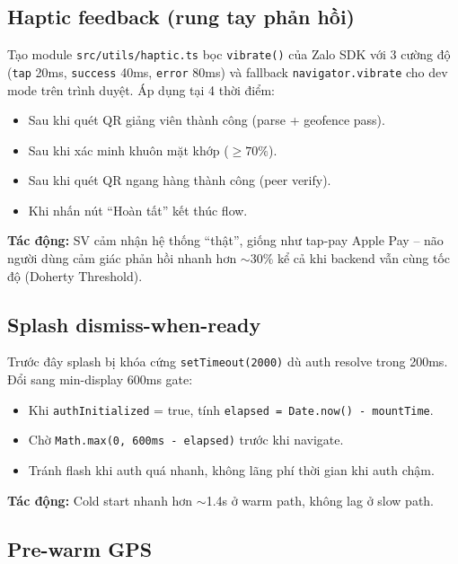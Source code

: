 \documentclass{article}
\begin{document}
\subsection{Haptic feedback (rung tay phản hồi)}

Tạo module \texttt{src/utils/haptic.ts} bọc \texttt{vibrate()} của Zalo SDK với 3 cường độ (\texttt{tap} 20ms, \texttt{success} 40ms, \texttt{error} 80ms) và fallback \texttt{navigator.vibrate} cho dev mode trên trình duyệt. Áp dụng tại 4 thời điểm:

\begin{itemize}[leftmargin=1.5em]
  \item Sau khi quét QR giảng viên thành công (parse + geofence pass).
  \item Sau khi xác minh khuôn mặt khớp ($\geq 70\%$).
  \item Sau khi quét QR ngang hàng thành công (peer verify).
  \item Khi nhấn nút ``Hoàn tất'' kết thúc flow.
\end{itemize}

\textbf{Tác động:} SV cảm nhận hệ thống ``thật'', giống như tap-pay Apple Pay -- não người dùng cảm giác phản hồi nhanh hơn ${\sim}30\%$ kể cả khi backend vẫn cùng tốc độ (Doherty Threshold).

\subsection{Splash dismiss-when-ready}

Trước đây splash bị khóa cứng \texttt{setTimeout(2000)} dù auth resolve trong 200ms. Đổi sang min-display 600ms gate:

\begin{itemize}[leftmargin=1.5em]
  \item Khi \texttt{authInitialized} = true, tính \texttt{elapsed = Date.now() - mountTime}.
  \item Chờ \texttt{Math.max(0, 600ms - elapsed)} trước khi navigate.
  \item Tránh flash khi auth quá nhanh, không lãng phí thời gian khi auth chậm.
\end{itemize}

\textbf{Tác động:} Cold start nhanh hơn $\sim$1.4s ở warm path, không lag ở slow path.

\subsection{Pre-warm GPS}
\end{document}
